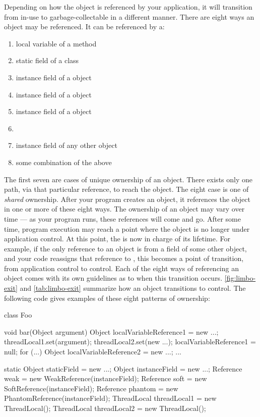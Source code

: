 Depending on how the object is referenced by your application, it will
transition from in-use to garbage-collectable in a different manner. There are
eight ways an object may be referenced. It can be referenced by a:

\begin{enumerate}
  \item local variable of a method
  \item static field of a class
  \item instance field of a  object
  \item instance field of a  object
  \item instance field of a  object
  \item \tls
  \item instance field of any other object
  \item some combination of the above
\end{enumerate}

The first seven are cases of unique ownership of an object. There exists
only one path, via that particular reference, to reach the object. The eight case
is one of \emph{shared} ownership. After your program creates an object, it
references the object in one or more of these eight ways. The ownership of an
object may vary over time --- as your program runs, these references will come
and go. After some time, program execution may reach a point where the object is
no longer under application control. At this point, the \jre is now in charge of
its lifetime. For example, if the only reference to an object is from a field of
some other object, and your code reassigns that reference to , this
becomes a point of transition, from application control to \jre control. Each of
the eight ways of referencing an object comes with its own guidelines as to when
this transition occurs. \autoref{fig:limbo-exit} and \autoref{tab:limbo-exit}
summarize how an object transitions to \jre control. The following code gives
examples of these eight patterns of ownership:
\lstset{numbers=left,numbersep=12pt,numberstyle=\tiny\textsf}
\begin{shortlisting}
class Foo {
   void bar(Object argument) {
      Object localVariableReference1 = new ...;
      threadLocal1.set(argument);
      threadLocal2.set(new ...);
      localVariableReference1 = null;
      for (...) {
         Object localVariableReference2 = new ...;
         ...
      }
   }

   static Object staticField = new ...;
   Object instanceField = new ...;
   Reference weak = new WeakReference(instanceField);
   Reference soft = new SoftReference(instanceField);
   Reference phantom = new PhantomReference(instanceField);
   ThreadLocal threadLocal1 = new ThreadLocal();
   ThreadLocal threadLocal2 = new ThreadLocal();
}
\end{shortlisting}
\lstset{numbers=none}

